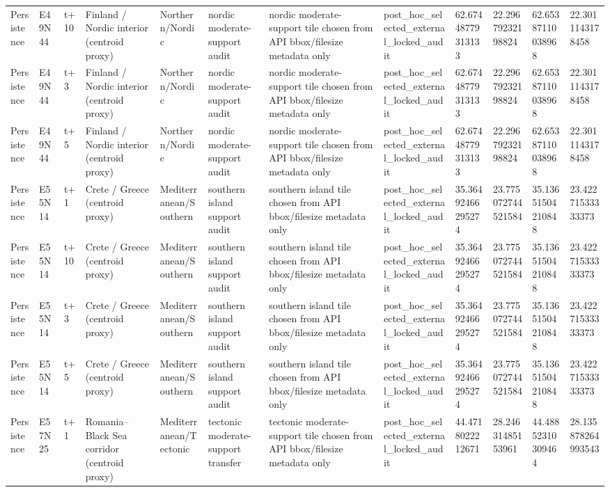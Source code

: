 \begin{landscape}
\begin{longtable}{llllllllllll}
Persistence & E49N44 & t+10 & Finland / Nordic interior (centroid proxy) & Northern/Nordic & nordic moderate-support audit & nordic moderate-support tile chosen from API bbox/filesize metadata only & post\_hoc\_selected\_external\_locked\_audit & 62.67448779313133 & 22.29679232198824 & 62.65387110038968 & 22.3011143178458 \\
Persistence & E49N44 & t+3 & Finland / Nordic interior (centroid proxy) & Northern/Nordic & nordic moderate-support audit & nordic moderate-support tile chosen from API bbox/filesize metadata only & post\_hoc\_selected\_external\_locked\_audit & 62.67448779313133 & 22.29679232198824 & 62.65387110038968 & 22.3011143178458 \\
Persistence & E49N44 & t+5 & Finland / Nordic interior (centroid proxy) & Northern/Nordic & nordic moderate-support audit & nordic moderate-support tile chosen from API bbox/filesize metadata only & post\_hoc\_selected\_external\_locked\_audit & 62.67448779313133 & 22.29679232198824 & 62.65387110038968 & 22.3011143178458 \\
Persistence & E55N14 & t+1 & Crete / Greece (centroid proxy) & Mediterranean/Southern & southern island support audit & southern island tile chosen from API bbox/filesize metadata only & post\_hoc\_selected\_external\_locked\_audit & 35.36492466295274 & 23.775072744521584 & 35.13651504210848 & 23.42271533333373 \\
Persistence & E55N14 & t+10 & Crete / Greece (centroid proxy) & Mediterranean/Southern & southern island support audit & southern island tile chosen from API bbox/filesize metadata only & post\_hoc\_selected\_external\_locked\_audit & 35.36492466295274 & 23.775072744521584 & 35.13651504210848 & 23.42271533333373 \\
Persistence & E55N14 & t+3 & Crete / Greece (centroid proxy) & Mediterranean/Southern & southern island support audit & southern island tile chosen from API bbox/filesize metadata only & post\_hoc\_selected\_external\_locked\_audit & 35.36492466295274 & 23.775072744521584 & 35.13651504210848 & 23.42271533333373 \\
Persistence & E55N14 & t+5 & Crete / Greece (centroid proxy) & Mediterranean/Southern & southern island support audit & southern island tile chosen from API bbox/filesize metadata only & post\_hoc\_selected\_external\_locked\_audit & 35.36492466295274 & 23.775072744521584 & 35.13651504210848 & 23.42271533333373 \\
Persistence & E57N25 & t+1 & Romania–Black Sea corridor (centroid proxy) & Mediterranean/Tectonic & tectonic moderate-support transfer & tectonic moderate-support tile chosen from API bbox/filesize metadata only & post\_hoc\_selected\_external\_locked\_audit & 44.4718022212671 & 28.24631485153961 & 44.48852310309464 & 28.135878264993543 \\

\end{longtable}
\end{landscape}
